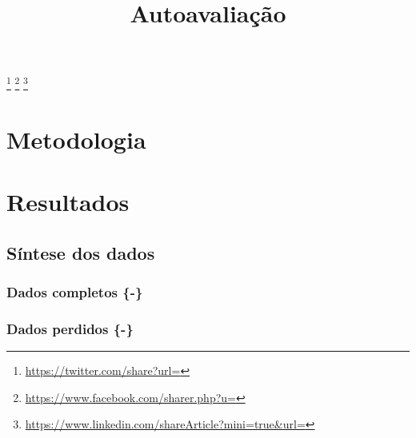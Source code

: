 \documentclass[
  a4paper,
]{book}
\title{Autoavaliação}
\author{}
\date{\vspace{-2.5em}}
\renewcommand{\href}[2]{#2\footnote{\url{#1}}}
\begin{document}
\maketitle


\newpage

{
\setcounter{tocdepth}{1}
\tableofcontents
}
\mainmatter
\clearpage
\markboth{}{}

\mainmatter
\clearpage
\markboth{}{}

\href{https://twitter.com/share?url=}{} \href{https://www.facebook.com/sharer.php?u=}{} \href{https://www.linkedin.com/shareArticle?mini=true\&url=}{}

\hypertarget{metodologia}{%
\section*{\texorpdfstring{\textbf{Metodologia}}{Metodologia}}\label{metodologia}}

\newpage

\hypertarget{resultados}{%
\section*{\texorpdfstring{\textbf{Resultados}}{Resultados}}\label{resultados}}

\hypertarget{suxedntese-dos-dados}{%
\subsection*{\texorpdfstring{\textbf{Síntese dos dados}}{Síntese dos dados}}\label{suxedntese-dos-dados}}

\hypertarget{dados-completos--}{%
\subsubsection{\texorpdfstring{\textbf{Dados completos \{-\}}}{Dados completos \{-\}}}\label{dados-completos--}}

\hypertarget{dados-perdidos--}{%
\subsubsection{\texorpdfstring{\textbf{Dados perdidos \{-\}}}{Dados perdidos \{-\}}}\label{dados-perdidos--}}
\end{document}
